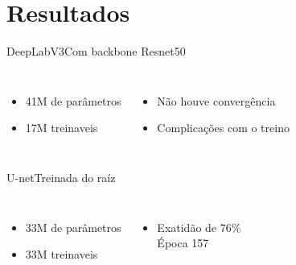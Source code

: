 \section{Resultados}


\begin{frame}[c]{DeepLabV3}{Com backbone Resnet50}

    \begin{columns}
            \begin{itemize}
                  \item 41M de parâmetros
                  \item 17M treinaveis
            \end{itemize}
            \begin{itemize}
                  \item Não houve convergência
                  \item Complicações com o treino
            \end{itemize}
    \end{columns}

    
  \end{frame}


\begin{frame}[c]{U-net}{Treinada do raíz}

  \begin{columns}

      \begin{itemize}
            \item 33M de parâmetros
            \item 33M treinaveis
      \end{itemize}

    \begin{itemize}
      \item Exatidão de 76\% \\Época 157
    \end{itemize}


  \end{columns}

\end{frame}

\newcommand{\plotA}{\inserttrainvalplot{resources/data/train_info_unet_200_smooth.csv}{ylabel=Loss, xmin=0, xmax=157, ymin=0, ymax=2, title=U-Net from scratch - Smoothed losses}{Train losses}{Validation losses}{north east}}
\newcommand{\plotB}{\inserttrainvalplot{resources/data/train_info_unet_200_smooth.csv}{ylabel=DICE Score, xmin=0, xmax=157, ymin=0, ymax=1, title=U-Net from scratch - Smoothed DICE scores}{Train DICE}{Validation DICE}{north west}}

